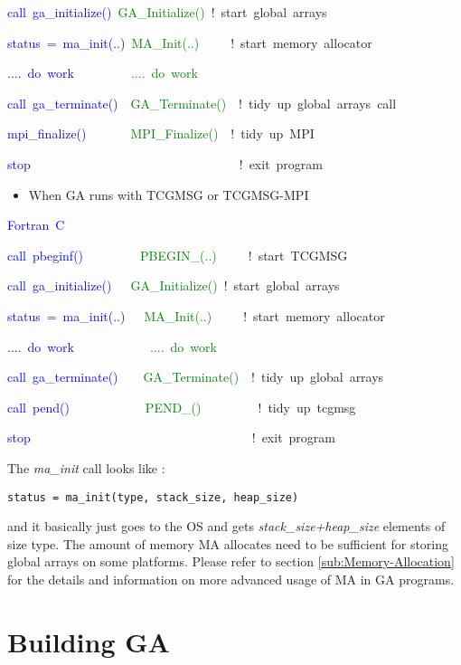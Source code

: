 \textcolor{blue}{call~ga\_initialize()}~\textcolor{green}{GA\_Initialize()~}!~start~global~arrays~

\textcolor{blue}{status~=~ma\_init(..)}~\textcolor{green}{MA\_Init(..)~}~~~~!~start~memory~allocator

\textcolor{blue}{....~do~work~~}~~~~~~~\textcolor{green}{....~do~work}

\textcolor{blue}{call~ga\_terminate()}~~\textcolor{green}{GA\_Terminate()~}~!~tidy~up~global~arrays~call

\textcolor{blue}{mpi\_finalize()}~~~~~~~\textcolor{green}{MPI\_Finalize()}~~!~tidy~up~MPI~~

\textcolor{blue}{stop}~~~~~~~~~~~~~~~~~~~~~~~~~~~~~~~~~!~exit~program
\begin{itemize}
\item When GA runs with TCGMSG or TCGMSG-MPI\end{itemize}

\textcolor{blue}{Fortran~C}

\textcolor{blue}{call~pbeginf()~}~~~~~~~~\textcolor{green}{PBEGIN\_(..)~}~~~~!~start~TCGMSG~

\textcolor{blue}{call~ga\_initialize()}~~~\textcolor{green}{GA\_Initialize()}~!~start~global~arrays~

\textcolor{blue}{status~=~ma\_init(..)}~~~\textcolor{green}{MA\_Init(..)}~~~~~!~start~memory~allocator

\textcolor{blue}{....~do~work~}~~~~~~~~~~~\textcolor{green}{....~do~work}

\textcolor{blue}{call~ga\_terminate()}~~~~\textcolor{green}{GA\_Terminate()~}~!~tidy~up~global~arrays~

\textcolor{blue}{call~pend()}~~~~~~~~~~~~\textcolor{green}{PEND\_()}~~~~~~~~~!~tidy~up~tcgmsg~

\textcolor{blue}{stop~}~~~~~~~~~~~~~~~~~~~~~~~~~~~~~~~~~~!~exit~program~

The \emph{ma\_init }call looks like :
\begin{verbatim}
status = ma_init(type, stack_size, heap_size)
\end{verbatim}
and it basically just goes to the OS and gets \emph{stack\_size+heap\_size}
elements of size type. The amount of memory MA allocates need to be
sufficient for storing global arrays on some platforms. Please refer
to section \ref{sub:Memory-Allocation} for the details and information
on more advanced usage of MA in GA programs. 


\section{Building GA }

